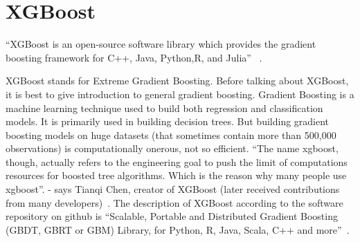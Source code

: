 \section{XGBoost} 

``XGBoost is an open-source software library which provides the gradient
boosting framework for C++, Java, Python,R, and Julia'' ~\cite{hid-sp18-401
-XGBoost-wiki}.

XGBoost stands for Extreme Gradient Boosting. Before talking about XGBoost, it
is best to give introduction to general gradient boosting. Gradient Boosting
is a machine learning technique used to build both regression and
classification models. It is primarily used in building decision trees. But
building gradient boosting models on huge datasets (that sometimes contain
more than 500,000 observations) is computationally onerous, not so efficient.
``The name xgboost, though, actually refers to the engineering goal to push
the limit of computations resources for boosted tree algorithms. Which is the
reason why many people use xgboost''.  - says Tianqi Chen, creator of XGBoost
(later received contributions from many developers)~\cite{hid-sp18-401
-XGBoost-gen}. The description of XGBoost according to the software repository
on github is ``Scalable, Portable and Distributed Gradient Boosting (GBDT,
GBRT or GBM) Library, for Python, R, Java, Scala, C++ and more''~\cite{hid-
sp18-401-XGBoost-git}.

